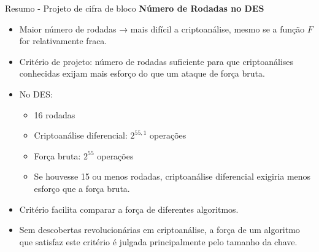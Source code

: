 \begin{frame}{Resumo - Projeto de cifra de bloco}
    \textbf{Número de Rodadas no DES}
    \begin{itemize}
        \item Maior número de rodadas → mais difícil a criptoanálise, mesmo se a função $F$ for relativamente fraca.
        \item Critério de projeto: número de rodadas suficiente para que criptoanálises conhecidas exijam mais esforço do que um ataque de força bruta.
        \item No DES:
              \begin{itemize}
                  \item 16 rodadas
                  \item Criptoanálise diferencial: $2^{55,1}$ operações
                  \item Força bruta: $2^{55}$ operações
                  \item Se houvesse 15 ou menos rodadas, criptoanálise diferencial exigiria menos esforço que a força bruta.
              \end{itemize}
        \item Critério facilita comparar a força de diferentes algoritmos.
        \item Sem descobertas revolucionárias em criptoanálise, a força de um algoritmo que satisfaz este critério é julgada principalmente pelo tamanho da chave.
    \end{itemize}



\end{frame}

